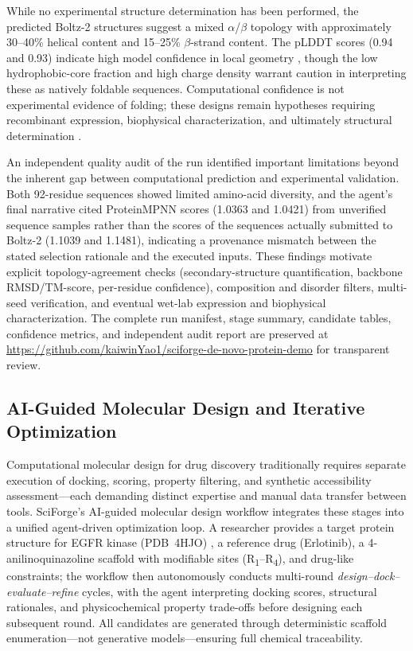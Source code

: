 \documentclass[sn-basic,Numbered,pdflatex]{sn-jnl}
\begin{document}
While no experimental structure determination has been performed, the predicted Boltz-2 structures suggest a mixed $\alpha$/$\beta$ topology with approximately 30--40\% helical content and 15--25\% $\beta$-strand content. The pLDDT scores (0.94 and 0.93) indicate high model confidence in local geometry \cite{jumper2021alphafold}, though the low hydrophobic-core fraction and high charge density warrant caution in interpreting these as natively foldable sequences. Computational confidence is not experimental evidence of folding; these designs remain hypotheses requiring recombinant expression, biophysical characterization, and ultimately structural determination \cite{rocklin2017proteinFolding}.

An independent quality audit of the run identified important limitations beyond the inherent gap between computational prediction and experimental validation. Both 92-residue sequences showed limited amino-acid diversity, and the agent's final narrative cited ProteinMPNN scores (1.0363 and 1.0421) from unverified sequence samples rather than the scores of the sequences actually submitted to Boltz-2 (1.1039 and 1.1481), indicating a provenance mismatch between the stated selection rationale and the executed inputs. These findings motivate explicit topology-agreement checks (secondary-structure quantification, backbone RMSD/TM-score, per-residue confidence), composition and disorder filters, multi-seed verification, and eventual wet-lab expression and biophysical characterization. The complete run manifest, stage summary, candidate tables, confidence metrics, and independent audit report are preserved at \url{https://github.com/kaiwinYao1/sciforge-de-novo-protein-demo} for transparent review.

\subsection{AI-Guided Molecular Design and Iterative Optimization}

Computational molecular design for drug discovery traditionally requires separate execution of docking, scoring, property filtering, and synthetic accessibility assessment---each demanding distinct expertise and manual data transfer between tools. SciForge's AI-guided molecular design workflow integrates these stages into a unified agent-driven optimization loop. A researcher provides a target protein structure for EGFR kinase (PDB~4HJO) \cite{park2012egfr}, a reference drug (Erlotinib), a 4-anilinoquinazoline scaffold with modifiable sites (R\textsubscript{1}--R\textsubscript{4}), and drug-like constraints; the workflow then autonomously conducts multi-round \emph{design--dock--evaluate--refine} cycles, with the agent interpreting docking scores, structural rationales, and physicochemical property trade-offs before designing each subsequent round. All candidates are generated through deterministic scaffold enumeration---not generative models---ensuring full chemical traceability.
\end{document}
